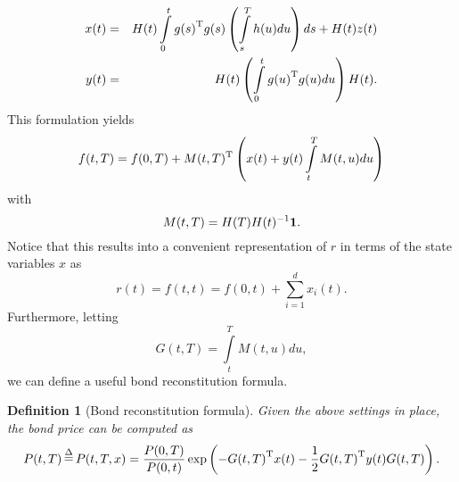 \documentclass[11pt,a4paper]{article}
\newtheorem{definition}{Definition}[section]
\numberwithin{equation}{section}
\begin{document}
\begin{eqnarray}
x(t) &=& H(t)\int\limits_0^t {g{{(s)}^{\rm{T}}}g(s)\left( {\int\limits_s^T {h(u)du} } \right)ds}  + H(t)z(t)\nonumber \\
y(t) &=& H(t)\left( {\int\limits_0^t {g{{(u)}^{\rm{T}}}g(u)du} } \right)H(t).\label{eq:y_gaussian2f}
\end{eqnarray}
This formulation yields
\begin{equation*}
f(t,T) = f(0,T) + M{(t,T)^{\rm{T}}}\left( {x(t) + y(t)\int\limits_t^T {M(t,u)du} } \right)
\end{equation*}
with
\begin{equation*}
M(t,T) = H(T)H{(t)^{ - 1}}{\bf{1}}.
\end{equation*}
Notice that this results into a convenient representation of $r$ in terms of the state variables $x$ as
\begin{equation*}
  r(t) = f(t,t) = f(0,t) + \sum\limits_{i = 1}^d {{x_i}(t)}.
\end{equation*}
Furthermore, letting 
\begin{equation*}
  G(t,T) = \int\limits_t^T {M(t,u)du} ,
\end{equation*}
we can define a useful bond reconstitution formula. 
\begin{definition}[Bond reconstitution formula]
Given the above settings in place, the bond price can be computed as
\begin{equation*}
  P(t,T)\mathop  = \limits^\Delta  P(t,T,x) = \frac{{P(0,T)}}{{P(0,t)}}\exp \left( { - G{{(t,T)}^{\rm{T}}}x(t) - \frac{1}{2}G{{(t,T)}^{\rm{T}}}y(t)G(t,T)} \right).
\end{equation*}
\end{definition}
\end{document}
